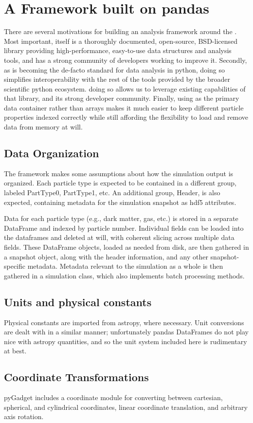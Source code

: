 \section{A Framework built on pandas}
\label{framework}

There are several motivations for building an analysis framework around the . 
Most important,  itself is a thoroughly documented, open-source, BSD-licensed library providing high-performance, easy-to-use data structures and analysis tools, and has a strong community of developers working to improve it.  
Secondly, as  is becoming the de-facto standard for data analysis in python, doing so simplifies interoperability with the rest of the tools provided by the broader scientific python ecosystem.
doing so allows us to leverage existing capabilities of that library, and its strong developer community.
Finally, using  as the primary data container rather than  arrays makes it much easier to keep different particle properties indexed correctly while still affording the flexibility to load and remove data from memory at will.

\subsection{Data Organization}
\label{hierarchy}
The framework makes some assumptions about how the simulation output is organized.  Each particle type is expected to be contained in a different group, labeled PartType0, PartType1, etc. An additional group, Header, is also expected, containing metadata for the simulation snapshot as hdf5 attributes.  

Data for each particle type (e.g., dark matter, gas, etc.) is stored in a separate DataFrame and indexed by particle number.  Individual fields can be loaded into the dataframes and deleted at will, with coherent slicing across multiple data fields.   These DataFrame objects, loaded as needed from disk, are then gathered in a snapshot object, along with the header information, and any other snapshot-specific metadata.  Metadata relevant to the simulation as a whole is then gathered in a simulation class, which also implements batch processing methods.

\subsection{Units and physical constants}
\label{units}
Physical constants are imported from astropy, where necessary.  Unit conversions are dealt with in a similar manner; unfortunately pandas DataFrames do not play nice with astropy quantities, and so the unit system included here is rudimentary at best.

\subsection{Coordinate Transformations}
\label{coordinates}
pyGadget includes a coordinate module for converting between cartesian, spherical, and cylindrical coordinates, linear coordinate translation, and arbitrary axis rotation.